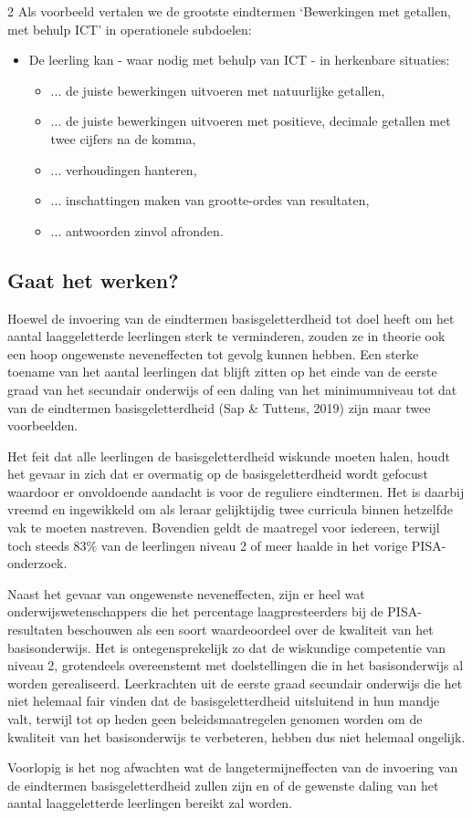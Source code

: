 \begin{multicols}{2}
Als voorbeeld vertalen we de grootste eindtermen `Bewerkingen met getallen, met behulp ICT' in operationele subdoelen:
\begin{itemize}
    \item De leerling kan - waar nodig met behulp van ICT - in herkenbare situaties:
    \begin{itemize}
        \item ... de juiste bewerkingen uitvoeren met natuurlijke getallen,
        \item ... de juiste bewerkingen uitvoeren met positieve, decimale getallen met twee cijfers na de komma,
        \item ... verhoudingen hanteren,
        \item ... inschattingen maken van grootte-ordes van resultaten,
        \item ... antwoorden zinvol afronden.
    \end{itemize}
\end{itemize}


\subsection*{Gaat het werken?}
Hoewel de invoering van de eindtermen basisgeletterdheid tot doel heeft om het aantal laaggeletterde leerlingen sterk te verminderen, zouden ze in theorie ook een hoop ongewenste neveneffecten tot gevolg kunnen hebben. Een sterke toename van het aantal leerlingen dat blijft zitten op het einde van de eerste graad van het secundair onderwijs of een daling van het minimumniveau tot dat van de eindtermen basisgeletterdheid (Sap \& Tuttens, 2019) zijn maar twee voorbeelden. 

Het feit dat alle leerlingen de basisgeletterdheid wiskunde moeten halen, houdt het gevaar in zich dat er overmatig op de basisgeletterdheid wordt gefocust waardoor er onvoldoende aandacht is voor de reguliere eindtermen. Het is daarbij vreemd en ingewikkeld om als leraar gelijktijdig twee curricula binnen hetzelfde vak te moeten nastreven. Bovendien geldt de maatregel voor iedereen, terwijl toch steeds 83$\%$ van de leerlingen niveau 2 of meer haalde in het vorige PISA-onderzoek.

Naast het gevaar van ongewenste neveneffecten, zijn er heel wat onderwijswetenschappers die het percentage laagpresteerders bij de PISA-resultaten beschouwen als een soort waardeoordeel over de kwaliteit van het basisonderwijs. Het is ontegensprekelijk zo dat de wiskundige competentie van niveau 2, grotendeels overeenstemt met doelstellingen die in het basisonderwijs al worden gerealiseerd. Leerkrachten uit de eerste graad secundair onderwijs die het niet helemaal fair vinden dat de basisgeletterdheid uitsluitend in hun mandje valt, terwijl tot op heden geen beleidsmaatregelen genomen worden om de kwaliteit van het basisonderwijs te verbeteren, hebben dus niet helemaal ongelijk.

Voorlopig is het nog afwachten wat de langetermijneffecten van de invoering van de eindtermen basisgeletterdheid zullen zijn en of de gewenste daling van het aantal laaggeletterde leerlingen bereikt zal worden. 
\end{multicols}


